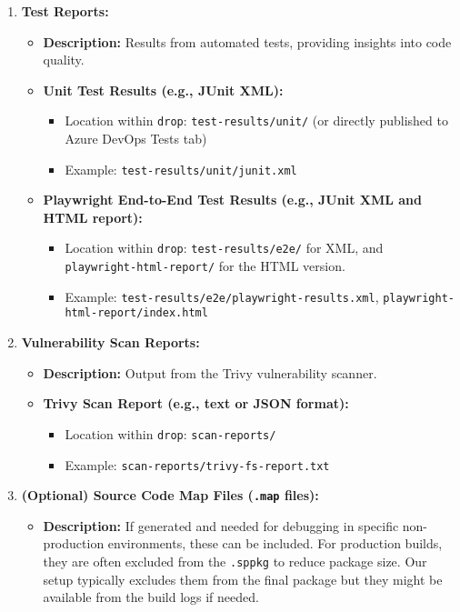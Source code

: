 \begin{enumerate}
    \item \textbf{Test Reports:}
    \begin{itemize}
        \item \textbf{Description:} Results from automated tests, providing insights into code quality.
        \item \textbf{Unit Test Results (e.g., JUnit XML):}
        \begin{itemize}
            \item Location within \texttt{drop}: \texttt{test-results/unit/} (or directly published to Azure DevOps Tests tab)
            \item Example: \texttt{test-results/unit/junit.xml}
        \end{itemize}
        \item \textbf{Playwright End-to-End Test Results (e.g., JUnit XML and HTML report):}
        \begin{itemize}
            \item Location within \texttt{drop}: \texttt{test-results/e2e/} for XML, and \texttt{playwright-html-report/} for the HTML version.
            \item Example: \texttt{test-results/e2e/playwright-results.xml}, \texttt{playwright-html-report/index.html}
        \end{itemize}
    \end{itemize}

    \item \textbf{Vulnerability Scan Reports:}
    \begin{itemize}
        \item \textbf{Description:} Output from the Trivy vulnerability scanner.
        \item \textbf{Trivy Scan Report (e.g., text or JSON format):}
        \begin{itemize}
            \item Location within \texttt{drop}: \texttt{scan-reports/}
            \item Example: \texttt{scan-reports/trivy-fs-report.txt}
        \end{itemize}
    \end{itemize}

    \item \textbf{(Optional) Source Code Map Files (\texttt{.map} files):}
    \begin{itemize}
        \item \textbf{Description:} If generated and needed for debugging in specific non-production environments, these can be included. For production builds, they are often excluded from the \texttt{.sppkg} to reduce package size. Our setup typically excludes them from the final package but they might be available from the build logs if needed.
    \end{itemize}
\end{enumerate}

